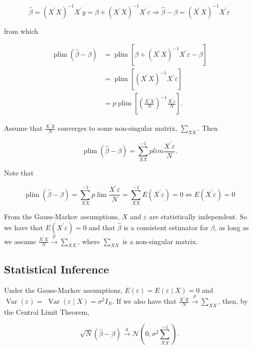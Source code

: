 $$
\widehat{\beta}=\left(X^{\prime} X\right)^{-1} X^{\prime} y=\beta+\left(X^{\prime} X\right)^{-1} X^{\prime} \varepsilon \Longrightarrow \widehat{\beta}-\beta=\left(X^{\prime} X\right)^{-1} X^{\prime} \varepsilon
$$

from which

$$
\begin{aligned}
\operatorname{plim}(\widehat{\beta}-\beta) & =\operatorname{plim}\left[\beta+\left(X^{\prime} X\right)^{-1} X^{\prime} \varepsilon-\beta\right] \\
& =\operatorname{plim}\left[\left(X^{\prime} X\right)^{-1} X^{\prime} \varepsilon\right] \\
& =p \operatorname{plim}\left[\left(\frac{X^{\prime} X}{N}\right)^{-1} \frac{X^{\prime} \varepsilon}{N}\right] .
\end{aligned}
$$

Assume that $\frac{X^{\prime} X}{N}$ converges to some non-singular matrix, $\sum_{X X}$. Then

$$
\operatorname{plim}(\widehat{\beta}-\beta)=\sum_{X X}^{-1} p l i m \frac{X^{\prime} \varepsilon}{N} .
$$

Note that

$$
\operatorname{plim}(\widehat{\beta}-\beta)=\sum_{X X}^{-1} p \lim \frac{X^{\prime} \varepsilon}{N}=\sum_{X X}^{-1} E\left(X^{\prime} \varepsilon\right)=0 \Longleftrightarrow E\left(X^{\prime} \varepsilon\right)=0
$$

From the Gauss-Markov assumptions, $X$ and $\varepsilon$ are statistically independent. So we have that $E\left(X^{\prime} \varepsilon\right)=0$ and that $\widehat{\beta}$ is a consistent estimator for $\beta$, as long as we assume $\frac{X^{\prime} X}{N} \xrightarrow{p} \sum_{X X}$, where $\sum_{X X}$ is a non-singular matrix.

\subsection{Statistical Inference}
Under the Gauss-Markov assumptions, $E(\varepsilon)=E(\varepsilon \mid X)=0$ and $\operatorname{Var}(\varepsilon)=$ $\operatorname{Var}(\varepsilon \mid X)=\sigma^{2} I_{N}$. If we also have that $\frac{X^{\prime} X}{N} \xrightarrow{p} \sum_{X X}$, then, by the Central Limit Theorem,

$$
\sqrt{N}(\widehat{\beta}-\beta) \xrightarrow{d} \mathcal{N}\left(0, \sigma^{2} \sum_{X X}^{-1}\right) .
$$

